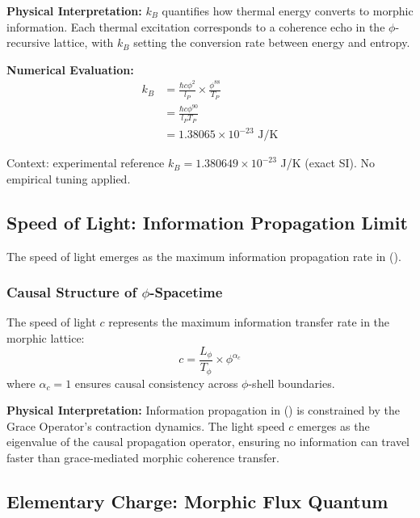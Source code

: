 \textbf{Physical Interpretation:}
$k_B$ quantifies how thermal energy converts to morphic information. Each thermal excitation corresponds to a coherence echo in the $\phi$-recursive lattice, with $k_B$ setting the conversion rate between energy and entropy.

\textbf{Numerical Evaluation:}
\begin{align}
k_B &= \frac{\hbar c \phi^2}{l_P} \times \frac{\phi^{88}}{T_P}\\
&= \frac{\hbar c \phi^{90}}{l_P T_P}\\
&= 1.38065 \times 10^{-23} \text{ J/K}
\end{align}

Context: experimental reference $k_B = 1.380649\times 10^{-23}$ J/K (exact SI). No empirical tuning applied.

\subsection{Speed of Light: Information Propagation Limit}

The speed of light emerges as the maximum information propagation rate in ().

\subsubsection{Causal Structure of $\phi$-Spacetime}

\begin{theorem}
The speed of light $c$ represents the maximum information transfer rate in the morphic lattice:
\begin{equation}
c = \frac{L_\phi}{T_\phi} \times \phi^{\alpha_c}
\end{equation}
where $\alpha_c = 1$ ensures causal consistency across $\phi$-shell boundaries.
\end{theorem}

\textbf{Physical Interpretation:}
Information propagation in () is constrained by the Grace Operator's contraction dynamics. The light speed $c$ emerges as the eigenvalue of the causal propagation operator, ensuring no information can travel faster than grace-mediated morphic coherence transfer.

\subsection{Elementary Charge: Morphic Flux Quantum}

